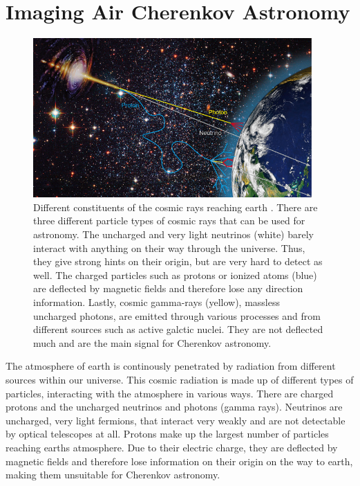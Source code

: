 \chapter{Imaging Air Cherenkov Astronomy}
\label{ch:iact}
%
\begin{figure}[H]
  \centering
  \includegraphics[width=0.95\textwidth]{Plots/cosmic_rays.jpg}
  \caption{Different constituents of the cosmic rays reaching earth \cite{cosmic-rays}. There are three different particle types of cosmic rays that can be used for astronomy. The uncharged and very light neutrinos (white) barely interact with anything on their way through the universe. Thus, they give strong hints on their origin, but are very hard to detect as well. The charged particles such as protons or ionized atoms (blue) are deflected by magnetic fields and therefore lose any direction information. Lastly, cosmic gamma-rays (yellow), massless uncharged photons, are emitted through various processes and from different sources such as active galctic nuclei. They are not deflected much and are the main signal for Cherenkov astronomy.}
  \label{fig:rays}
\end{figure}
%
The atmosphere of earth is continously penetrated by radiation from different
sources within our universe. This cosmic radiation is made up of different types
of particles, interacting with the atmosphere in various ways. There are
charged protons and the uncharged neutrinos and photons (gamma rays). Neutrinos
are uncharged, very light fermions, that interact very weakly and are not
detectable by optical telescopes at all. Protons make up the largest number of
particles reaching earths atmosphere. Due to their electric charge, they are
deflected by magnetic fields and therefore lose information on their origin on
the way to earth, making them unsuitable for Cherenkov astronomy.
%
